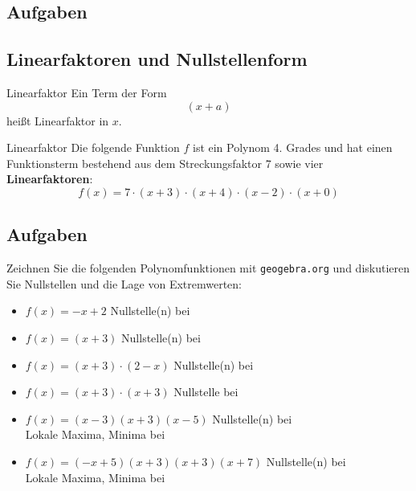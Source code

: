 \subsection*{Aufgaben}

\newpage



\subsection{Linearfaktoren und Nullstellenform}
\begin{definition}{Linearfaktor}{}
  Ein Term der Form
  $$(x+a)$$
  heißt Linearfaktor in $x$.
\end{definition}

\begin{beispiel}{Linearfaktor}{}
  Die folgende Funktion $f$ ist ein Polynom 4. Grades und hat einen
  Funktionsterm bestehend aus dem Streckungsfaktor 7 sowie vier \textbf{Linearfaktoren}:
  $$f(x) = 7\cdot{}(x+3)\cdot{}(x+4)\cdot{}(x-2)\cdot{}(x+0)$$
\end{beispiel}



\subsection*{Aufgaben}

Zeichnen Sie die folgenden Polynomfunktionen mit \texttt{geogebra.org}
und diskutieren Sie Nullstellen und die Lage von Extremwerten:

\begin{itemize}
\item $f(x) = -x + 2 $ Nullstelle(n) bei  
\item $f(x) = (x+3)$ Nullstelle(n) bei 
\item $f(x) = (x+3)\cdot{}(2-x)$ Nullstelle(n) bei
\item $f(x) = (x+3)\cdot{}(x+3)$ 
  Nullstelle bei 
\item $f(x) = (x-3)(x+3)(x-5)$ Nullstelle(n) bei \\
  Lokale Maxima, Minima bei 
\item $f(x) = (-x+5)(x+3)(x+3)(x+7)$ Nullstelle(n) bei
  \\
  Lokale Maxima, Minima bei 
\end{itemize}
\newpage
